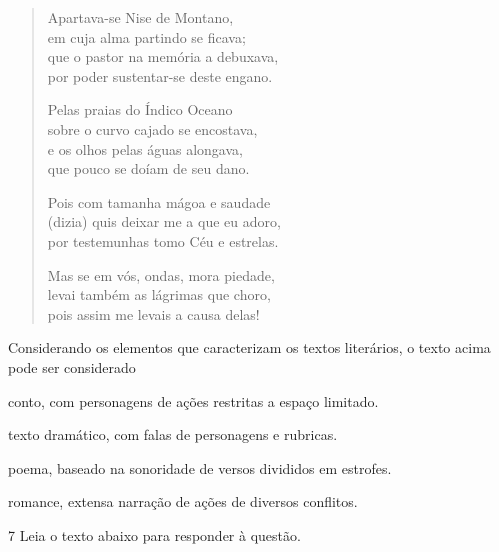 \begin{myquote}
\begin{verse}

Apartava-se Nise de Montano, \\
em cuja alma partindo se ficava; \\
que o pastor na memória a debuxava, \\
por poder sustentar-se deste engano.

Pelas praias do Índico Oceano \\
sobre o curvo cajado se encostava, \\
e os olhos pelas águas alongava, \\
que pouco se doíam de seu dano.

Pois com tamanha mágoa e saudade \\
(dizia) quis deixar me a que eu adoro, \\
por testemunhas tomo Céu e estrelas.

Mas se em vós, ondas, mora piedade, \\
levai também as lágrimas que choro, \\
pois assim me levais a causa delas!

\end{verse}
\end{myquote}


Considerando os elementos que caracterizam os textos literários, o texto
acima pode ser considerado

\begin{escolha}

    \item conto, com personagens de ações restritas a espaço limitado.
    
    \item texto dramático, com falas de personagens e rubricas.  
    
    \item poema, baseado na sonoridade de versos divididos em estrofes.  
    
    \item romance, extensa narração de ações de diversos conflitos. 

\end{escolha}

\num{7} Leia o texto abaixo para responder à questão. 

